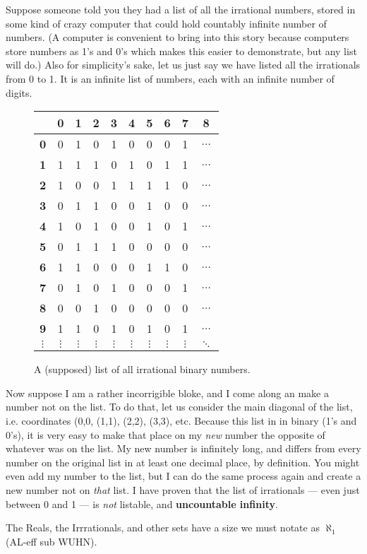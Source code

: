 Suppose someone told you they had a list of all the irrational numbers, stored in 
some kind of crazy computer that could hold countably infinite number of numbers.
(A computer is convenient to bring into this story because computers store numbers
as 1's and 0's which makes this easier to demonstrate, but any list will do.)  Also
for simplicity's sake, let us just say we have listed all the irrationals from 0 to 1.
It is an infinite list of numbers, each with an infinite number of digits.


\begin{figure}
\begin{center}
  \begin{tabular}{ c | c c c c c c c c c  }
    \hline
    		& \textbf{0} & \textbf{1} & \textbf{2} & \textbf{3} & \textbf{4} & \textbf{5} & \textbf{6} & \textbf{7} & \textbf{8} \\ \hline 
    \textbf{0} & 0 & 1 & 0 & 1 & 0 & 0 & 0 & 1 & $\dots$ \\ 
    \textbf{1} & 1 & 1 & 1 & 0 & 1 & 0 & 1 & 1 & $\dots$ \\ 
    \textbf{2} & 1 & 0 & 0 & 1 & 1 & 1 & 1 & 0 & $\dots$ \\
    \textbf{3} & 0 & 1 & 1 & 0 & 0 & 1 & 0 & 0 & $\dots$ \\ 
    \textbf{4} & 1 & 0 & 1 & 0 & 0 & 1 & 0 & 1 & $\dots$ \\
    \textbf{5} & 0 & 1 & 1 & 1 & 0 & 0 & 0 & 0 & $\dots$ \\ 
    \textbf{6} & 1 & 1 & 0 & 0 & 0 & 1 & 1 & 0 & $\dots$ \\
    \textbf{7} & 0 & 1 & 0 & 1 & 0 & 0 & 0 & 1 & $\dots$ \\ 
    \textbf{8} & 0 & 0 & 1 & 0 & 0 & 0 & 0 & 0 & $\dots$ \\
    \textbf{9} & 1 & 1 & 0 & 1 & 0 & 1 & 0 & 1 & $\dots$ \\ 
    $\vdots$ & $\vdots$ & $\vdots$ & $\vdots$ & $\vdots$ & $\vdots$ & $\vdots$ & $\vdots$ & $\vdots$ & $\ddots$ \\
  \end{tabular}
\caption{A (supposed) list of all irrational binary numbers.}
\end{center}
\end{figure}

Now suppose I am a rather incorrigible bloke, and I come along an make a
number not on the list.  To do that, let us consider the main diagonal of the
list, i.e. coordinates (0,0, (1,1), (2,2), (3,3), etc.  Because this list in in binary 
(1's and 0's), it is very easy to make that place on my \emph{new} number
the opposite of whatever was on the list.  My new number is infinitely long, and
differs from every number on the original list in at least one decimal place, by
definition.  You might even add my number to the list, but I can do the same
process again and create a new number not on \emph{that} list.  I have
proven that the list of irrationals --- even just between 0 and 1 --- is \emph{not}
listable, and \textbf{uncountable infinity}.

The Reals, the Irrrationals, and other sets have a size we must notate as
$\aleph_1$ (AL-eff sub WUHN).




